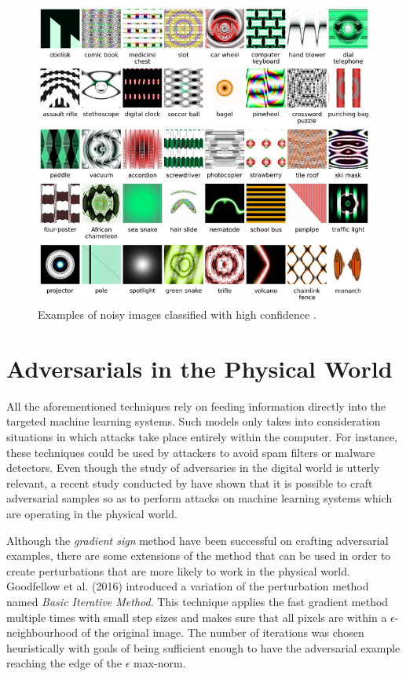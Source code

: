 \begin{figure}[!h]
	\centering
	\includegraphics[scale=1.]{unrec_images.png}
	\caption{Examples of noisy images classified with high confidence \cite{nguyen2015}.}
	\label{fig:unrec_images}
\end{figure}


\section{Adversarials in the Physical World}\label{sec:physical}

All the aforementioned techniques rely on feeding information directly into the targeted machine learning systems. Such models only takes into consideration situations in which attacks take place entirely within the computer. For instance, these techniques could be used by attackers to avoid spam filters or malware detectors. Even though the study of adversaries in the digital world is utterly relevant, a recent study conducted by \cite{goodfellow2016} have shown that it is possible to craft adversarial samples so as to perform attacks on machine learning systems which are operating in the physical world.

Although the \textit{gradient sign} method have been successful on crafting adversarial examples, there are some extensions of the method that can be used in order to create perturbations that are more likely to work in the physical world. Goodfellow et al. (2016) introduced a variation of the perturbation method named \textit{Basic Iterative Method}. This technique applies the fast gradient method multiple times with small step sizes and makes sure that all pixels are within a $\epsilon$-neighbourhood of the original image. The number of iterations was chosen heuristically with goals of being sufficient enough to have the adversarial example reaching the edge of the $\epsilon$ max-norm.


